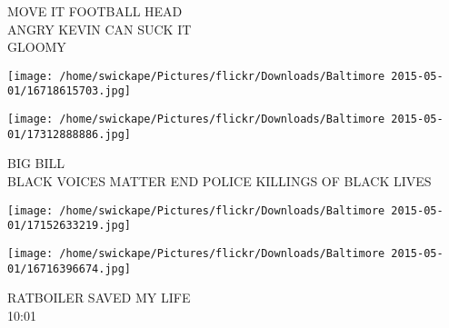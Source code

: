 \documentclass[10pt,letterpaper]{article}
\begin{document}
MOVE IT FOOTBALL HEAD\\
ANGRY KEVIN CAN SUCK IT\\
GLOOMY\\
\pagebreak

\texttt{[image: /home/swickape/Pictures/flickr/Downloads/Baltimore 2015-05-01/16718615703.jpg]}

\vspace{0.25in}
\texttt{[image: /home/swickape/Pictures/flickr/Downloads/Baltimore 2015-05-01/17312888886.jpg]}

BIG BILL\\
BLACK VOICES MATTER END POLICE KILLINGS OF BLACK LIVES\\
\pagebreak

\texttt{[image: /home/swickape/Pictures/flickr/Downloads/Baltimore 2015-05-01/17152633219.jpg]}

\vspace{0.25in}
\texttt{[image: /home/swickape/Pictures/flickr/Downloads/Baltimore 2015-05-01/16716396674.jpg]}

RATBOILER SAVED MY LIFE\\
10:01\\
\pagebreak
\end{document}
